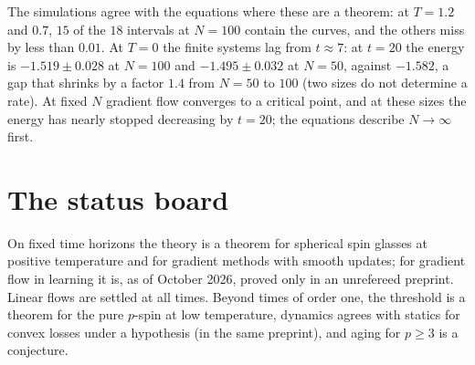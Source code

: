 \begin{refsection}
The simulations agree with the equations where these are a theorem: at $T=1.2$ and $0.7$, $15$ of the $18$ intervals at $N=100$ contain the curves, and the others miss by less than $0.01$. At $T=0$ the finite systems lag from $t\approx7$: at $t=20$ the energy is $-1.519\pm0.028$ at $N=100$ and $-1.495\pm0.032$ at $N=50$, against $-1.582$, a gap that shrinks by a factor $1.4$ from $N=50$ to $100$ (two sizes do not determine a rate). At fixed $N$ gradient flow converges to a critical point, and at these sizes the energy has nearly stopped decreasing by $t=20$; the equations describe $N\to\infty$ first.

\section{The status board}\label{sec:dmft:status}

On fixed time horizons the theory is a theorem for spherical spin glasses at positive temperature and for gradient methods with smooth updates; for gradient flow in learning it is, as of October 2026, proved only in an unrefereed preprint. Linear flows are settled at all times. Beyond times of order one, the threshold is a theorem for the pure $p$-spin at low temperature, dynamics agrees with statics for convex losses under a hypothesis (in the same preprint), and aging for $p\ge3$ is a conjecture.


\end{refsection}

